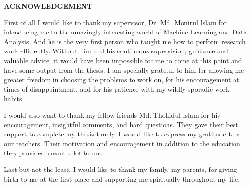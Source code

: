\begin{center}
  \textbf{{\Large ACKNOWLEDGEMENT}}\\[60pt]
\end{center}

First of all I would like to thank my supervisor, Dr. Md. Monirul Islam for introducing me to the amazingly interesting world of Machine Learning and Data Analysis. And he is the very first person who taught me how to perform research work efficiently. Without him and his continuous supervision, guidance and valuable advice, it would have been impossible for me to come at this point and have some output from the thesis. I am specially grateful to him for allowing me greater freedom in choosing the problems to work on, for his encouragement at times of disappointment, and for his patience with my wildly sporadic work habits.

I would also want to thank my fellow friends Md. Thohidul Islam for his encouragement, insightful comments, and hard questions. They gave their best support to complete my thesis timely.
I would like to express my gratitude to all our teachers. Their motivation and encouragement in addition to the education they provided meant a lot to me.

Last but not the least, I would like to thank my family, my parents, for giving birth to me at the first place and supporting me spiritually throughout my life.

\vfill

\endinput
